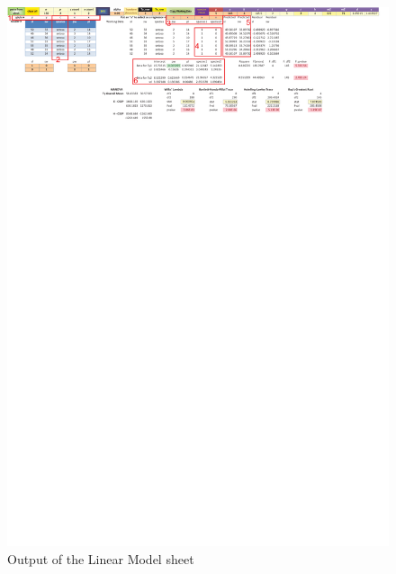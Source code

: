 \documentclass[article]{jss}
\begin{document}
        \begin{figure}[!tbh]
                \centering
                \includegraphics[width=\linewidth, keepaspectratio=true]{img/LMSheetOutput_markup}
                \vspace{-20pt}\centering{}\protect\caption{Output of the Linear Model sheet}\label{fig:LMSheetOutput_markup}
        \end{figure}
        
\end{document}

